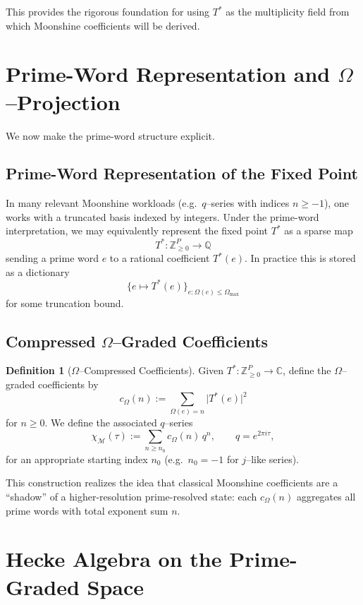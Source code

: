 \documentclass[11pt]{article}
\theoremstyle{definition}
\newtheorem{definition}{Definition}[section]
\theoremstyle{plain}
\theoremstyle{remark}
\newcommand{\Mcal}{\mathcal{M}}
\newcommand{\Zbb}{\mathbb{Z}}
\newcommand{\Qbb}{\mathbb{Q}}
\newcommand{\Cbb}{\mathbb{C}}
\newcommand{\OmegaVal}{\Omega}
\begin{document}
This provides the rigorous foundation for using $T^*$ as the multiplicity field from which Moonshine coefficients will be derived.

\section{Prime-Word Representation and $\OmegaVal$–Projection}

We now make the prime-word structure explicit.

\subsection{Prime-Word Representation of the Fixed Point}

In many relevant Moonshine workloads (e.g.\ $q$--series with indices $n \ge -1$), one works with a truncated basis indexed by integers.
Under the prime-word interpretation, we may equivalently represent the fixed point $T^*$ as a sparse map
\[
  T^* : \Zbb_{\ge 0}^P \to \Qbb
\]
sending a prime word $e$ to a rational coefficient $T^*(e)$.
In practice this is stored as a dictionary
\[
  \{ e \mapsto T^*(e) \}_{e: \OmegaVal(e)\le \OmegaVal_{\max}}
\]
for some truncation bound.

\subsection{Compressed $\OmegaVal$–Graded Coefficients}

\begin{definition}[$\OmegaVal$–Compressed Coefficients]
Given $T^* : \Zbb_{\ge 0}^P \to \Cbb$, define the $\OmegaVal$–graded coefficients by
\begin{equation}
  c_\Omega(n) := \sum_{\OmegaVal(e) = n} \bigl|T^*(e)\bigr|^2
\end{equation}
for $n \ge 0$.
We define the associated $q$--series
\begin{equation}
  \chi_{\Mcal}(\tau)
  := \sum_{n \ge n_0} c_\Omega(n)\, q^n,\qquad q = e^{2\pi i \tau},
\end{equation}
for an appropriate starting index $n_0$ (e.g.\ $n_0=-1$ for $j$–like series).
\end{definition}

This construction realizes the idea that classical Moonshine coefficients are a ``shadow'' of a higher-resolution prime-resolved state: each $c_\Omega(n)$ aggregates all prime words with total exponent sum $n$.

\section{Hecke Algebra on the Prime-Graded Space}
\end{document}
